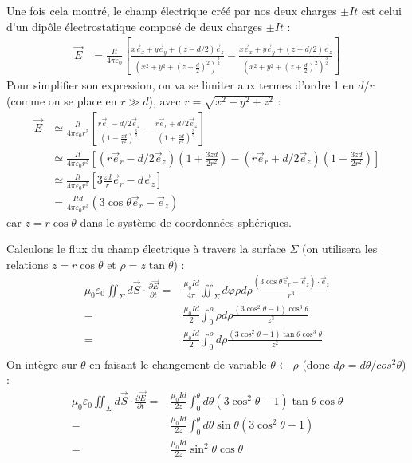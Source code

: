 \begin{correction}
	Une fois cela montré, le champ électrique créé par nos deux charges $\pm It$ est celui d'un dipôle électrostatique composé de deux charges $\pm It$ :
	\begin{align}
		\vec{E}&=\frac{It}{4\pi\varepsilon_0}\left[\frac{x\vec{e}_x+y\vec{e}_y+(z-d/2)\vec{e}_z}{\left(x^2+y^2+\left(z-\frac{d}{2}\right)^2\right)^\frac{3}{2}}-\frac{x\vec{e}_x+y\vec{e}_y+(z+d/2)\vec{e}_z}{\left(x^2+y^2+\left(z+\frac{d}{2}\right)^2\right)^\frac{3}{2}}\right] 
	\end{align}
	Pour simplifier son expression, on va se limiter aux termes d'ordre 1 en $d/r$ (comme on se place en $r\gg d$), avec $r=\sqrt{x^2+y^2+z^2}$ :
	\begin{align}
		\vec{E}&\simeq\frac{It}{4\pi\varepsilon_0 r^3}\left[\frac{r\vec{e}_r-d/2\vec{e}_z}{\left(1-\frac{zd}{r^2}\right)^\frac{3}{2}}-\frac{r\vec{e}_r+d/2\vec{e}_z}{\left(1+\frac{zd}{r^2}\right)^\frac{3}{2}}\right] \\
		&\simeq\frac{It}{4\pi\varepsilon_0 r^3}\left[(r\vec{e}_r-d/2\vec{e}_z)\left(1+\frac{3zd}{2r^2}\right)-(r\vec{e}_r+d/2\vec{e}_z)\left(1-\frac{3zd}{2r^2}\right) \right] \\
		&\simeq\frac{It}{4\pi\varepsilon_0 r^3}\left[3\frac{zd}{r}\vec{e}_r-d\vec{e}_z\right]\\
		&=\frac{Itd}{4\pi\varepsilon_0 r^3}(3\cos\theta\vec{e}_r-\vec{e}_z)
	\end{align}	
	car $z=r\cos\theta$ dans le système de coordonnées sphériques. 

	Calculons le flux du champ électrique à travers la surface $\Sigma$ (on utilisera les relations $z=r\cos\theta$ et $\rho=z\tan\theta$) :
	\begin{align*}
		\mu_0\varepsilon_0\iint_\Sigma d\vec{S}\cdot\frac{\partial \vec{E}}{\partial t} =& \frac{\mu_0Id}{4\pi}\iint_\Sigma d\varphi\rho d\rho\frac{(3\cos\theta\vec{e}_r-\vec{e}_z)\cdot\vec{e}_z}{r^3} \\
		=&\frac{\mu_0Id}{2}\int_0^\rho\rho d\rho\frac{(3\cos^2\theta-1)\cos^3\theta}{z^3} \\
		=&\frac{\mu_0Id}{2}\int_0^\rho d\rho\frac{(3\cos^2\theta-1)\tan\theta\cos^3\theta}{z^2} \\
	\end{align*}
	On intègre sur $\theta$ en faisant le changement de variable $\theta\longleftarrow\rho$ (donc $d\rho=d\theta/cos^2\theta$) :
	\begin{align*}
		\mu_0\varepsilon_0\iint_\Sigma d\vec{S}\cdot\frac{\partial \vec{E}}{\partial t} =& \frac{\mu_0Id}{2z}\int_0^\theta d\theta(3\cos^2\theta-1)\tan\theta\cos\theta \\
		=&\frac{\mu_0Id}{2z}\int_0^\theta d\theta \sin\theta(3\cos^2\theta-1) \\
		=&\frac{\mu_0Id}{2z}\sin^2\theta\cos\theta
	\end{align*}	


\end{correction}
